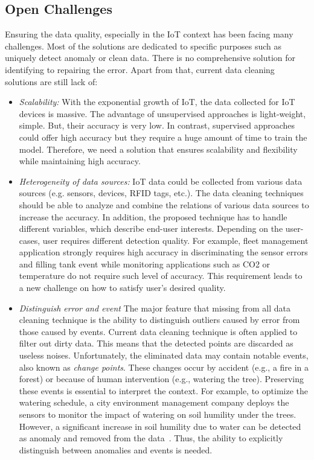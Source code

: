 \subsection{Open Challenges}

Ensuring the data quality, especially in the IoT context has been facing many challenges. Most of the solutions are dedicated to specific purposes such as uniquely detect anomaly or clean data. There is no comprehensive solution for identifying to repairing the error. Apart from that, current data cleaning solutions are still lack of:
\begin{itemize}
    \item \textit{Scalability: } With the exponential growth of IoT, the data collected for IoT devices is massive. The advantage of unsupervised approaches is light-weight, simple. But, their accuracy is very low. In contrast, supervised approaches could offer high accuracy but they require a huge amount of time to train the model. Therefore, we need a solution that ensures scalability and flexibility while maintaining high accuracy.
    
    \item \textit{Heterogeneity of data sources: } IoT data could be collected from various data sources (e.g. sensors, devices, RFID tags, etc.). The data cleaning techniques should be able to analyze and combine the relations of various data sources to increase the accuracy. In addition, the proposed technique has to handle different variables, which describe end-user interests. Depending on the user-cases, user requires different detection quality. For example, fleet management application strongly requires high accuracy in discriminating the sensor errors and filling tank event while monitoring applications such as CO2 or temperature do not require such level of accuracy. This requirement leads to a new challenge on how to satisfy user's desired quality.
    
    \item \textit{Distinguish error and event} The major feature that missing from all data cleaning technique is the ability to distinguish outliers caused by error from those caused by events. Current data cleaning technique is often applied to filter out dirty data. This means that the detected points are discarded as useless noises. Unfortunately, the eliminated data may contain notable events, also known as {\em change points}. These changes occur by accident (e.g., a fire in a forest) or because of human intervention (e.g., watering the tree). Preserving these events is essential to interpret the context. For example, to optimize the watering schedule, a city environment management company deploys the sensors to monitor the impact of watering on soil humility under the trees. However, a significant increase in soil humility due to water can be detected as anomaly and removed from the data~\cite{kang2013prevention}. Thus, the ability to explicitly distinguish between anomalies and events is needed. 
    
\end{itemize}


